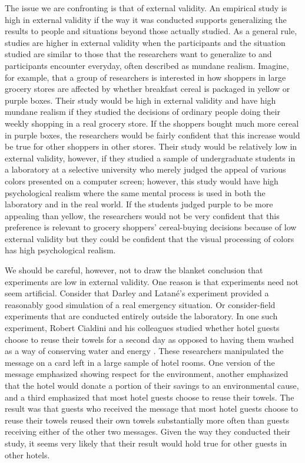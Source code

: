 The issue we are confronting is that of external validity. An empirical study is high in external validity if the way it was conducted supports generalizing the results to people and situations beyond those actually studied. As a general rule, studies are higher in external validity when the participants and the situation studied are similar to those that the researchers want to generalize to and participants encounter everyday, often described as mundane realism. Imagine, for example, that a group of researchers is interested in how shoppers in large grocery stores are affected by whether breakfast cereal is packaged in yellow or purple boxes. Their study would be high in external validity and have high mundane realism if they studied the decisions of ordinary people doing their weekly shopping in a real grocery store. If the shoppers bought much more cereal in purple boxes, the researchers would be fairly confident that this increase would be true for other shoppers in other stores. Their study would be relatively low in external validity, however, if they studied a sample of undergraduate students in a laboratory at a selective university who merely judged the appeal of various colors presented on a computer screen; however, this study would have high psychological realism where the same mental process is used in both the laboratory and in the real world. If the students judged purple to be more appealing than yellow, the researchers would not be very confident that this preference is relevant to grocery shoppers' cereal-buying decisions because of low external validity but they could be confident that the visual processing of colors has high psychological realism.
 
We should be careful, however, not to draw the blanket conclusion that experiments are low in external validity. One reason is that experiments need not seem artificial. Consider that Darley and Latan\'e's experiment provided a reasonably good simulation of a real emergency situation. Or consider-field experiments that are conducted entirely outside the laboratory. In one such experiment, Robert Cialdini and his colleagues studied whether hotel guests choose to reuse their towels for a second day as opposed to having them washed as a way of conserving water and energy \citep{cialdini_dont_2005}. These researchers manipulated the message on a card left in a large sample of hotel rooms. One version of the message emphasized showing respect for the environment, another emphasized that the hotel would donate a portion of their savings to an environmental cause, and a third emphasized that most hotel guests choose to reuse their towels. The result was that guests who received the message that most hotel guests choose to reuse their towels reused their own towels substantially more often than guests receiving either of the other two messages. Given the way they conducted their study, it seems very likely that their result would hold true for other guests in other hotels.
 
